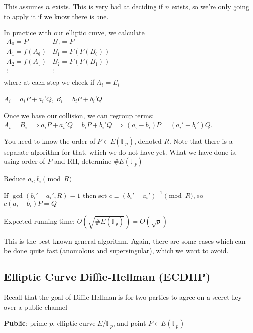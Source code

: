 \documentclass[twoside, 10pt]{article}
\newcommand{\F}{\mathbb{F}}
\begin{document}
\begin{rmk}
    This assumes $n$ exists. This is very bad at deciding if $n$ exists, so we're only going to apply it if we know there is one.
\end{rmk}

In practice with our elliptic curve, we calculate\\
$\begin{matrix}
    A_0 = P & B_0 = P\\
    A_1 = f(A_0) & B_1 = F(F(B_0))\\
    A_2 = f(A_1) & B_2 = F(F(B_1))\\
    \vdots & \vdots\\
\end{matrix}$\\
where at each step we check if $A_i = B_i$

\begin{rmk}
    $A_i = a_i P + a_i'Q$, $B_i = b_iP + b_i'Q$
\end{rmk}

Once we have our collision, we can regroup terms: $A_i = B_i \implies a_i P + a_i'Q = b_iP + b_i'Q \implies (a_i - b_i)P = (a_i' - b_i')Q$.

\begin{rmk}
    You need to know the order of $P \in E(\F_p)$, denoted $R$. Note that there is a separate algorithm for that, which we do not have yet. What we have done is, using order of $P$ and RH, determine $\#E(\F_p)$
\end{rmk}

Reduce $a_i, b_i \pmod{R}$

If $\gcd(b_i' -a_i', R) = 1$ then set $c \equiv (b_i' - a_i')^{-1}\pmod{R}$, so $c(a_i-b_i)P = Q$

Expected running time: $O(\sqrt{\# E(\F_p)}) = O(\sqrt{p})$

\begin{rmk}
    This is the best known general algorithm. Again, there are some cases which can be done quite fast (anomolous and supersingular), which we want to avoid.
\end{rmk}

\subsection{Elliptic Curve Diffie-Hellman (ECDHP)} Recall that the goal of Diffie-Hellman is for two parties to agree on a secret key over a public channel

\textbf{Public}: prime $p$, elliptic curve $E/\F_p$, and point $P \in E(\F_p)$
\end{document}
